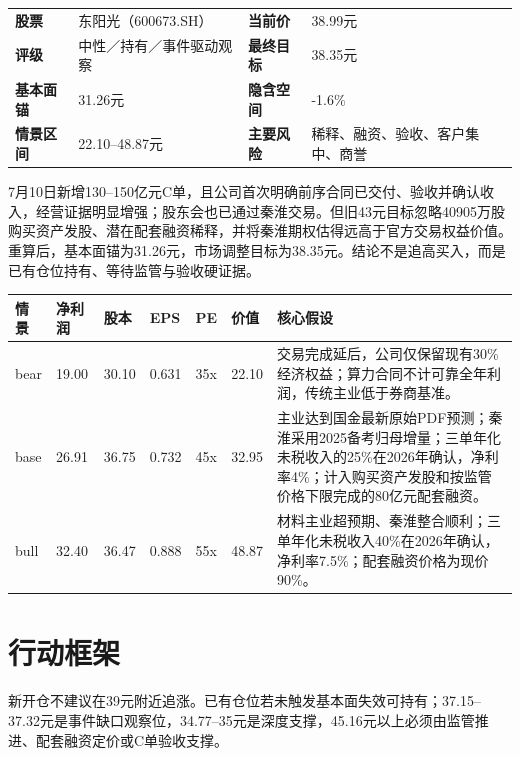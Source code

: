 \begin{dashboardbox}[投资结论]
\noindent\begin{tabularx}{\textwidth}{L{3.0cm}X L{3.0cm}X}
\textbf{股票} & 东阳光（600673.SH） & \textbf{当前价} & 38.99元 \\
\textbf{评级} & 中性／持有／事件驱动观察 & \textbf{最终目标} & 38.35元 \\
\textbf{基本面锚} & 31.26元 & \textbf{隐含空间} & -1.6\% \\
\textbf{情景区间} & 22.10--48.87元 & \textbf{主要风险} & 稀释、融资、验收、客户集中、商誉 \\
\end{tabularx}
\end{dashboardbox}

\begin{houseviewbox}[本机构观点]
7月10日新增130--150亿元C单，且公司首次明确前序合同已交付、验收并确认收入，经营证据明显增强；股东会也已通过秦淮交易。但旧43元目标忽略40905万股购买资产发股、潜在配套融资稀释，并将秦淮期权估得远高于官方交易权益价值。重算后，基本面锚为31.26元，市场调整目标为38.35元。结论不是追高买入，而是已有仓位持有、等待监管与验收硬证据。
\end{houseviewbox}

\begin{exhibitbox}[三情景估值]
\noindent\begin{tabularx}{\textwidth}{L{1.6cm}R{1.5cm}R{1.4cm}R{1.4cm}R{1.2cm}R{1.2cm}X}
\toprule
\textbf{情景} & \textbf{净利润} & \textbf{股本} & \textbf{EPS} & \textbf{PE} & \textbf{价值} & \textbf{核心假设} \\
\midrule
bear & 19.00 & 30.10 & 0.631 & 35x & 22.10 & 交易完成延后，公司仅保留现有30\%经济权益；算力合同不计可靠全年利润，传统主业低于券商基准。 \\
base & 26.91 & 36.75 & 0.732 & 45x & 32.95 & 主业达到国金最新原始PDF预测；秦淮采用2025备考归母增量；三单年化未税收入的25\%在2026年确认，净利率4\%；计入购买资产发股和按监管价格下限完成的80亿元配套融资。 \\
bull & 32.40 & 36.47 & 0.888 & 55x & 48.87 & 材料主业超预期、秦淮整合顺利；三单年化未税收入40\%在2026年确认，净利率7.5\%；配套融资价格为现价90\%。 \\
\bottomrule
\end{tabularx}
\end{exhibitbox}

\section{行动框架}

新开仓不建议在39元附近追涨。已有仓位若未触发基本面失效可持有；37.15--37.32元是事件缺口观察位，34.77--35元是深度支撑，45.16元以上必须由监管推进、配套融资定价或C单验收支撑。

